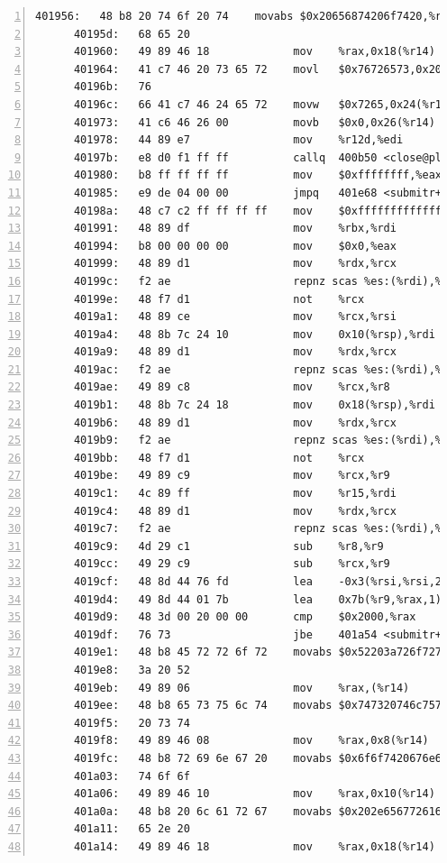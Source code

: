 \documentclass{article}
\begin{document}
\begin{lstlisting}[title = bomb的反汇编代码及部分注释, xleftmargin = 2em,xrightmargin = 2em, aboveskip = 1em, numbers = left, basicstyle=\scriptsize\ttfamily, numberstyle=\scriptsize]
      401956:	48 b8 20 74 6f 20 74 	movabs $0x20656874206f7420,%rax
      40195d:	68 65 20 
      401960:	49 89 46 18          	mov    %rax,0x18(%r14)
      401964:	41 c7 46 20 73 65 72 	movl   $0x76726573,0x20(%r14)
      40196b:	76 
      40196c:	66 41 c7 46 24 65 72 	movw   $0x7265,0x24(%r14)
      401973:	41 c6 46 26 00       	movb   $0x0,0x26(%r14)
      401978:	44 89 e7             	mov    %r12d,%edi
      40197b:	e8 d0 f1 ff ff       	callq  400b50 <close@plt>
      401980:	b8 ff ff ff ff       	mov    $0xffffffff,%eax
      401985:	e9 de 04 00 00       	jmpq   401e68 <submitr+0x6bc>
      40198a:	48 c7 c2 ff ff ff ff 	mov    $0xffffffffffffffff,%rdx
      401991:	48 89 df             	mov    %rbx,%rdi
      401994:	b8 00 00 00 00       	mov    $0x0,%eax
      401999:	48 89 d1             	mov    %rdx,%rcx
      40199c:	f2 ae                	repnz scas %es:(%rdi),%al
      40199e:	48 f7 d1             	not    %rcx
      4019a1:	48 89 ce             	mov    %rcx,%rsi
      4019a4:	48 8b 7c 24 10       	mov    0x10(%rsp),%rdi
      4019a9:	48 89 d1             	mov    %rdx,%rcx
      4019ac:	f2 ae                	repnz scas %es:(%rdi),%al
      4019ae:	49 89 c8             	mov    %rcx,%r8
      4019b1:	48 8b 7c 24 18       	mov    0x18(%rsp),%rdi
      4019b6:	48 89 d1             	mov    %rdx,%rcx
      4019b9:	f2 ae                	repnz scas %es:(%rdi),%al
      4019bb:	48 f7 d1             	not    %rcx
      4019be:	49 89 c9             	mov    %rcx,%r9
      4019c1:	4c 89 ff             	mov    %r15,%rdi
      4019c4:	48 89 d1             	mov    %rdx,%rcx
      4019c7:	f2 ae                	repnz scas %es:(%rdi),%al
      4019c9:	4d 29 c1             	sub    %r8,%r9
      4019cc:	49 29 c9             	sub    %rcx,%r9
      4019cf:	48 8d 44 76 fd       	lea    -0x3(%rsi,%rsi,2),%rax
      4019d4:	49 8d 44 01 7b       	lea    0x7b(%r9,%rax,1),%rax
      4019d9:	48 3d 00 20 00 00    	cmp    $0x2000,%rax
      4019df:	76 73                	jbe    401a54 <submitr+0x2a8>
      4019e1:	48 b8 45 72 72 6f 72 	movabs $0x52203a726f727245,%rax
      4019e8:	3a 20 52 
      4019eb:	49 89 06             	mov    %rax,(%r14)
      4019ee:	48 b8 65 73 75 6c 74 	movabs $0x747320746c757365,%rax
      4019f5:	20 73 74 
      4019f8:	49 89 46 08          	mov    %rax,0x8(%r14)
      4019fc:	48 b8 72 69 6e 67 20 	movabs $0x6f6f7420676e6972,%rax
      401a03:	74 6f 6f 
      401a06:	49 89 46 10          	mov    %rax,0x10(%r14)
      401a0a:	48 b8 20 6c 61 72 67 	movabs $0x202e656772616c20,%rax
      401a11:	65 2e 20 
      401a14:	49 89 46 18          	mov    %rax,0x18(%r14)

\end{lstlisting}
\end{document}
